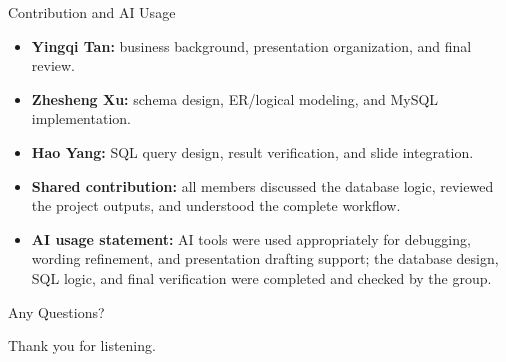 \documentclass[aspectratio=169]{beamer}
\begin{document}
\begin{frame}{Contribution and AI Usage}
\small
\begin{itemize}
    \item \textbf{Yingqi Tan:} business background, presentation organization, and final review.
    \item \textbf{Zhesheng Xu:} schema design, ER/logical modeling, and MySQL implementation.
    \item \textbf{Hao Yang:} SQL query design, result verification, and slide integration.
    \item \textbf{Shared contribution:} all members discussed the database logic, reviewed the project outputs, and understood the complete workflow.
    \item \textbf{AI usage statement:} AI tools were used appropriately for debugging, wording refinement, and presentation drafting support; the database design, SQL logic, and final verification were completed and checked by the group.
\end{itemize}
\end{frame}

\begin{frame}
\centering
\vspace{2.2cm}
{\Huge Any Questions?}
\vspace{0.8cm}

{\large Thank you for listening.}
\end{frame}
\end{document}

